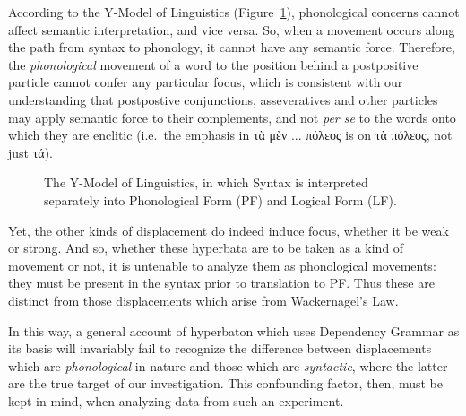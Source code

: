 \documentclass[letterpaper, 11pt]{article}
\begin{document}
According to the Y-Model of Linguistics (Figure~\ref{fig:y-model}), phonological
concerns cannot affect semantic interpretation, and vice versa. So, when a
movement occurs along the path from syntax to phonology, it cannot have any
semantic force. Therefore, the \emph{phonological} movement of a word to the
position behind a postpositive particle cannot confer any particular focus,
which is consistent with our understanding that postpostive conjunctions,
asseveratives and other particles may apply semantic force to their complements,
and not \emph{per se} to the words onto which they are enclitic (i.e.\ the
emphasis in \textgreek{τὰ μὲν ...  πόλεος} is on \textgreek{τὰ πόλεος}, not just
\textgreek{τά}).

\begin{figure}[h!]
\caption{The Y-Model of Linguistics, in which Syntax is interpreted
separately into Phonological Form (PF) and Logical Form (LF).}
\label{fig:y-model}
\end{figure}

Yet, the other kinds of displacement do indeed induce focus, whether it be weak
or strong. And so, whether these hyperbata are to be taken as a kind of movement
or not, it is untenable to analyze them as phonological movements: they must be
present in the syntax prior to translation to PF. Thus these are distinct from
those displacements which arise from Wackernagel's Law.

In this way, a general account of hyperbaton which uses Dependency Grammar as
its basis will invariably fail to recognize the difference between displacements
which are \emph{phonological} in nature and those which are \emph{syntactic},
where the latter are the true target of our investigation. This confounding
factor, then, must be kept in mind, when analyzing data from such an experiment.

\nocite{sophocles1999sophocles, euripides2002euripides}


\newpage
\end{document}
